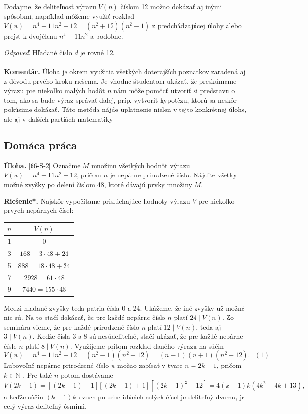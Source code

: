 \documentclass[11pt,a4paper,oneside,final]{book}
\newcommand{\NN}{\mathbb{N}}
\newcommand{\kom}{\textbf{Komentár.} }
\newcommand{\ul}{\textbf{Úloha.} }
\newcommand{\rieh}{\textbf{Riešenie*.} }
\begin{document}
Dodajme, že deliteľnosť výrazu $V (n)$ číslom 12 možno dokázať aj inými spôsobmi, napríklad môžeme využiť rozklad $V (n) = n^4+ 11n^2 - 12 = (n^2+ 12)(n^2 - 1)$ z predchádzajúcej úlohy alebo prejsť k dvojčlenu $n^4 + 11n^2$ a podobne.

\textit{Odpoveď}. Hľadané číslo $d$ je rovné 12.\\
\\
\kom Úloha je okrem využitia všetkých doterajších poznatkov zaradená aj z dôvodu prvého kroku riešenia. Je vhodné študentom ukázať, že preskúmanie výrazu pre niekoľko malých hodôt $n$ nám môže pomôcť utvoriť si predstavu o tom, ako sa bude výraz správať ďalej, príp. vytvoriť hypotézu, ktorú sa neskôr pokúsime dokázať. Táto metóda nájde uplatnenie nielen v tejto konkrétnej úlohe, ale aj v ďalších partiách matematiky.\\

\subsection*{Domáca práca}
\begin{tcolorbox}[breakable,notitle,boxrule=0pt,colback=light-gray,colframe=light-gray]\ul [66-S-2]
Označme $M$ množinu všetkých hodnôt výrazu $V (n) = n^4 + 11n^2 - 12$, pričom $n$ je nepárne prirodzené číslo. Nájdite všetky možné zvyšky po delení číslom 48, ktoré dávajú prvky množiny $M$.

\end{tcolorbox}

\rieh Najskôr vypočítame prislúchajúce hodnoty výrazu $V$ pre niekoľko prvých nepárnych čísel:
\begin{center}
\begin{tabular}{c c}
$n$ & $V (n)$\\
\hline
1 & 0\\
3 & $168 = 3 \cdot 48 + 24$ \\
5 & $888 = 18 \cdot 48 + 24$ \\
7 & $2928 = 61 \cdot 48$\\
9 & $7440 = 155 \cdot 48$
\end{tabular}
\end{center}

Medzi hľadané zvyšky teda patria čísla 0 a 24. Ukážeme, že iné zvyšky už možné nie sú. Na to stačí dokázať, že pre každé nepárne číslo $n$ platí $24 \mid V (n)$. Zo seminára vieme, že pre každé prirodzené číslo $n$ platí $12 \mid V (n)$, teda aj $3 \mid V (n)$. Keďže čísla 3 a 8 sú nesúdeliteľné, stačí ukázať, že pre každé nepárne číslo $n$ platí $8 \mid V (n)$. Využijeme
pritom rozklad daného výrazu na súčin
$$V (n) = n^4+ 11n^2 - 12 = (n^2 - 1)(n^2+ 12) = (n - 1)(n + 1)(n^2+ 12). \ \ \ (1)$$
Ľubovoľné nepárne prirodzené číslo $n$ možno zapísať v tvare $n = 2k - 1$, pričom $k \in \NN$ . Pre také $n$ potom dostávame
$$V (2k - 1) = [(2k - 1) - 1][(2k - 1) + 1][(2k - 1)^2
+ 12] = 4(k - 1)k(4k^2 - 4k + 13),$$
a keďže súčin $(k - 1)k$ dvoch po sebe idúcich celých čísel je deliteľný dvoma, je celý výraz deliteľný ôsmimi.
\end{document}
